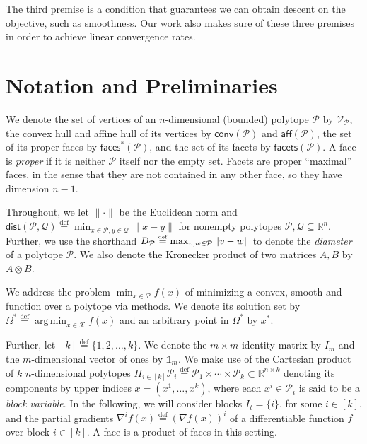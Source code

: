 \documentclass[twoside]{article}
\newcommand{\R}{\mathbb{R}}
\newcommand{\ones}{\mathbb{1}}
\newcommand{\mP}{\mathcal{P}}
\newcommand{\mQ}{\mathcal{Q}}
\newcommand{\mX}{\mathcal{X}}
\newcommand{\verts}[1]{\mathcal{V}_{#1}}
\newcommand{\conv}[1]{\mathsf{conv}\left(#1\right)}
\newcommand{\aff}[1]{\mathsf{aff}\left(#1\right)}
\newcommand{\faces}[1]{{\mathsf{faces}^\ast}\left(#1\right)}
\newcommand{\facets}[1]{\mathsf{facets}\left(#1\right)}
\newcommand{\dist}[1]{\mathsf{dist}\left(#1\right)}
\newcommand{\proj}{\mathsf{Proj}}
\DeclareMathOperator*{\argmin}{\mathrm{arg\,min}}
\newcommand{\defi}{\stackrel{\mathrm{\scriptscriptstyle def}}{=}}
\begin{document}
The third premise is a condition that guarantees we can obtain descent on the objective, such as smoothness. Our work also makes sure of these three premises in order to achieve linear convergence rates.

\section{Notation and Preliminaries}\label{s:preliminaries}

We denote the set of vertices of an $n$-dimensional (bounded) polytope $\mP$ by $\verts{\mP}$, the convex hull and affine hull of its vertices by $\conv{\mP}$ and $\aff{\mP}$, %
the set of its proper faces by $\faces{\mP}$, and the set of its facets by $\facets{\mP}$.
A face
is \emph{proper} if it is neither $\mP$ itself nor the empty set.
Facets are proper ``maximal'' faces, in the sense that they are not contained in any other face, so they have dimension $n-1$.

Throughout, we let $\|\cdot\|$ be the Euclidean norm and 
$\dist{\mP, \mQ} \defi \min_{x \in \mP, y \in \mQ} \|x - y\|$ for nonempty polytopes $\mP, \mQ \subseteq \R^n$. 
Further, we use the shorthand $\diam{\mP} \defi \max_{v, w \in \mathcal{P}} \|v - w\|$ to denote the \emph{diameter} of a polytope $\mathcal{P}$.
We also denote the Kronecker product of two matrices $A, B$ by $A \otimes B$.

We address the problem $\min_{x \in \mP} f(x)$ of minimizing a convex, smooth and \PL{} function over a polytope via \FW{} methods.
We denote its solution set by $\Omega^\ast \defi \argmin_{x \in \mX} f(x)$ and an arbitrary point in $\Omega^\ast$ by $x^\ast$.

Further, let $[k] \defi \{1, 2, \dots, k\}$. We denote the %
$m \times m$ identity matrix by $I_m$ and the $m$-dimensional vector of ones by $\ones_m$.
We make use of the Cartesian product of $k$ $n$-dimensional polytopes $\Pi_{i \in [k]} \mP_i \defi \mP_1 \times \cdots \times \mP_k \subset \R^{n \times k}$ denoting its components by upper indices $x = (x^1, \dots, x^k)$, where each $x^i \in \mP_i$ is said to be a \emph{block variable}.
In the following, we will consider blocks $I_t = \{i\}$, for some $i \in [k]$, and the partial gradients $\nabla^i f(x) \defi (\nabla f(x))^i$ of a differentiable function $f$ over block $i \in [k]$.
A face is a product of faces in this setting. 
\end{document}
